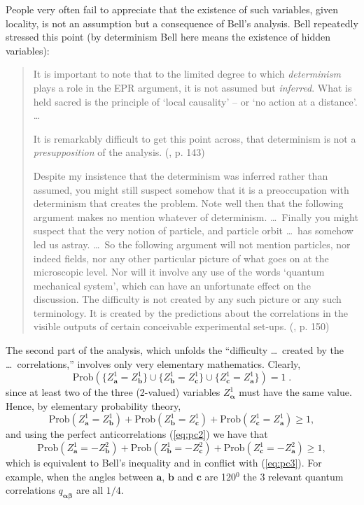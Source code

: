 \documentclass[12pt]{article}
\begin{document}
People very often fail to appreciate that the existence of such
variables, given locality, is not an assumption but a consequence of
Bell's analysis.  Bell repeatedly stressed this point (by determinism
Bell here means the existence of hidden variables):
   \begin{quotation}\small
     It is important to note that to the limited degree to which {\em
       determinism} plays a role in the EPR argument, it is not assumed
     but {\em inferred}. What is held sacred is the principle of `local
     causality' -- or `no action at a distance'.  \ldots

     It is remarkably difficult to get this point across, that
     determinism is not a {\em presupposition} of the analysis.
     (\cite{Bel87}, p. 143)

     Despite my insistence that the determinism was inferred rather
     than assumed, you might still suspect somehow that it is a
     preoccupation with determinism that creates the problem. Note well
     then that the following argument makes no mention whatever of
     determinism.  \ldots\ Finally you might suspect that the very
     notion of particle, and particle orbit \ldots\ has somehow led us
     astray. \ldots\ So the following argument will not mention
     particles, nor indeed fields, nor any other particular picture of
     what goes on at the microscopic level.  Nor will it involve any
     use of the words `quantum mechanical system', which can have an
     unfortunate effect on the discussion.  The difficulty is not
     created by any such picture or any such terminology.  It is
     created by the predictions about the correlations in the visible
     outputs of certain conceivable experimental set-ups.
     (\cite{Bel87}, p. 150)
\end{quotation}

The second part of the analysis, which unfolds the ``difficulty
\ldots\ created by the \ldots\ correlations,'' involves only very
elementary mathematics. Clearly,
$$
\text{Prob}\left( \{Z^{1}_{\mathbf{a}} = Z^{1}_{\mathbf{b}}\} \cup
   \{Z^{1}_{\mathbf{b}} = Z^{1}_{\mathbf{c}}\} \cup
   \{Z^{1}_{\mathbf{c}} = Z^{1}_{\mathbf{a}}\} \right) =1\;.$$
since at
least two of the three (2-valued) variables
$Z^{1}_{\boldsymbol{\alpha}}$ must have the same value. Hence, by
elementary probability theory,
$$
\text{Prob} \left( Z^{1}_{\mathbf{a}} = Z^{1}_{\mathbf{b}}\right) +
\text{Prob} \left( Z^{1}_{\mathbf{b}} = Z^{1}_{\mathbf{c}}\right) +
\text{Prob} \left( Z^{1}_{\mathbf{c}} = Z^{1}_{\mathbf{a}} \right) \ge
1, $$
and using the perfect anticorrelations (\ref{eq:pc2}) we have
that
   \begin{equation}
\text{Prob}
\left( Z^{1}_{\mathbf{a}} =  -Z^{2}_{\mathbf{b}}\right)
+ \text{Prob}
\left( Z^{1}_{\mathbf{b}} = -Z^{2}_{\mathbf{c}}\right)
+ \text{Prob}
\left(  Z^{1}_{\mathbf{c}} =
-Z^{2}_{\mathbf{a}}
     \right) \ge 1, \label{eq:bellineq}
\end{equation}
which is equivalent to Bell's inequality and in conflict with
(\ref{eq:pc3}).  For example, when the angles between $\mathbf{a}$,
$\mathbf{b}$ and $\mathbf{c}$ are 120$^{0}$ the 3 relevant quantum
correlations $q_{ {\boldsymbol{\alpha}} {\boldsymbol{\beta}} }$ are
all $1/4$.
\end{document}
